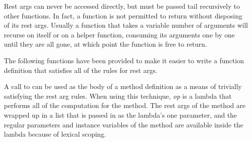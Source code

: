 
Rest args can never be accessed directly, but must be passed tail
recursively to other functions.  In fact, a function is not permitted
to return without disposing of its rest args.  Usually a function that
takes a variable number of arguments will recurse on itself or on a
helper function, consuming its arguments one by one until they are all
gone, at which point the function is free to return.

The following functions have been provided to make it easier to write a
function definition that satisfies all of the rules for rest args.



A call to  can be used as the body of a
method definition as a means of trivially satisfying the rest arg
rules.  When using this technique, \emph{op} is a lambda that performs
all of the computation for the method.  The rest args of the method
are wrapped up in a list that is passed in as the lambda's one
parameter, and the regular parameters and instance variables of the
method are available inside the lambda because of lexical scoping.
